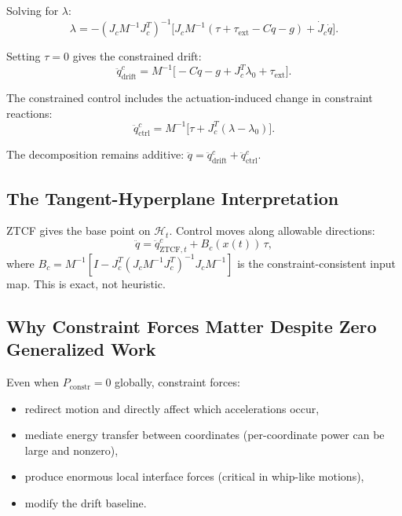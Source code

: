 \documentclass[11pt]{article}
\begin{document}
Solving for $\lambda$:
\begin{equation}\label{eq:lambda-general}
\lambda = -(J_cM^{-1}J_c^T)^{-1}\bigl[J_cM^{-1}(\tau+\tau_{\mathrm{ext}}-C\dot{q}-g)+\dot{J}_c\dot{q}\bigr].
\end{equation}

Setting $\tau=0$ gives the constrained drift:
\begin{equation}\label{eq:constrained-drift}
\ddot{q}_{\mathrm{drift}}^{c} = M^{-1}\bigl[-C\dot{q}-g+J_c^T\lambda_0+\tau_{\mathrm{ext}}\bigr].
\end{equation}

The constrained control includes the actuation-induced change in constraint reactions:
\begin{equation}\label{eq:constrained-ctrl}
\ddot{q}_{\mathrm{ctrl}}^{c} = M^{-1}\bigl[\tau+J_c^T(\lambda-\lambda_0)\bigr].
\end{equation}

The decomposition remains additive: $\ddot{q} = \ddot{q}_{\mathrm{drift}}^{c} + \ddot{q}_{\mathrm{ctrl}}^{c}$.

\subsection{The Tangent-Hyperplane Interpretation}

ZTCF gives the base point on $\mathcal{H}_t$.
Control moves along allowable directions:
\begin{equation}\label{eq:hyperplane-control}
\ddot{q} = \ddot{q}_{\mathrm{ZTCF},t}^{c} + B_c(x(t))\,\tau,
\end{equation}
where $B_c = M^{-1}[I - J_c^T(J_cM^{-1}J_c^T)^{-1}J_cM^{-1}]$ is the constraint-consistent input map.
This is exact, not heuristic.

\subsection{Why Constraint Forces Matter Despite Zero Generalized Work}

Even when $P_{\mathrm{constr}}=0$ globally, constraint forces:
\begin{itemize}
\item redirect motion and directly affect which accelerations occur,
\item mediate energy transfer between coordinates (per-coordinate power can be large and nonzero),
\item produce enormous local interface forces (critical in whip-like motions),
\item modify the drift baseline.
\end{itemize}
\end{document}
